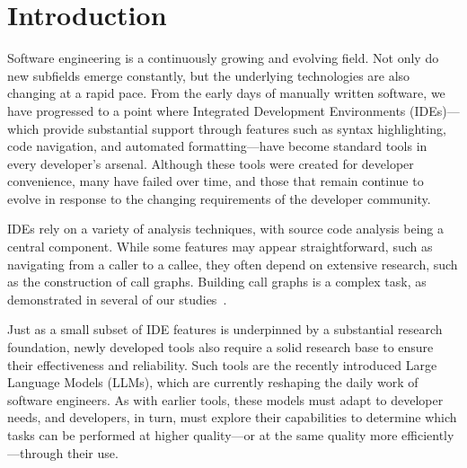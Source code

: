 \chapter{Introduction}



Software engineering is a continuously growing and evolving field.
Not only do new subfields emerge constantly, but the underlying technologies are also changing at a rapid pace.
From the early days of manually written software, we have progressed to a point where Integrated Development Environments (IDEs)—which provide substantial support through features such as syntax highlighting, code navigation, and automated formatting—have become standard tools in every developer’s arsenal.
Although these tools were created for developer convenience, many have failed over time, and those that remain continue to evolve in response to the changing requirements of the developer community.

IDEs rely on a variety of analysis techniques, with source code analysis being a central component.
While some features may appear straightforward, such as navigating from a caller to a callee, they often depend on extensive research, such as the construction of call graphs.
Building call graphs is a complex task, as demonstrated in several of our studies~\cite{cg1, cg2, cg3}.

Just as a small subset of IDE features is underpinned by a substantial research foundation, newly developed tools also require a solid research base to ensure their effectiveness and reliability.
Such tools are the recently introduced Large Language Models (LLMs), which are currently reshaping the daily work of software engineers.
As with earlier tools, these models must adapt to developer needs, and developers, in turn, must explore their capabilities to determine which tasks can be performed at higher quality—or at the same quality more efficiently—through their use.


